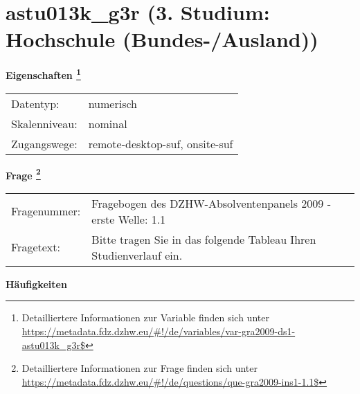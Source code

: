 
    \setcounter{footnote}{0}

    \vspace*{-1.8cm}
	\section{astu013k\_g3r (3. Studium: Hochschule (Bundes-/Ausland))}
	\label{section:astu013k_g3r}



    \vspace*{0.5cm}
    \noindent\textbf{Eigenschaften
	\footnote{Detailliertere Informationen zur Variable finden sich unter
		\url{https://metadata.fdz.dzhw.eu/\#!/de/variables/var-gra2009-ds1-astu013k_g3r$}}}\\
	\begin{tabularx}{\hsize}{@{}lX}
	Datentyp: & numerisch \\
	Skalenniveau: & nominal \\
	Zugangswege: &
	  remote-desktop-suf, 
	  onsite-suf
 \\
    \end{tabularx}



				\vspace*{0.5cm}
                \noindent\textbf{Frage
	                \footnote{Detailliertere Informationen zur Frage finden sich unter
		              \url{https://metadata.fdz.dzhw.eu/\#!/de/questions/que-gra2009-ins1-1.1$}}}\\
				\begin{tabularx}{\hsize}{@{}lX}
					Fragenummer: &
					  Fragebogen des DZHW-Absolventenpanels 2009 - erste Welle:
					  1.1
 \\
					Fragetext: & Bitte tragen Sie in das folgende Tableau Ihren Studienverlauf ein. \\
				\end{tabularx}





        		\vspace*{0.5cm}
                \noindent\textbf{Häufigkeiten}

